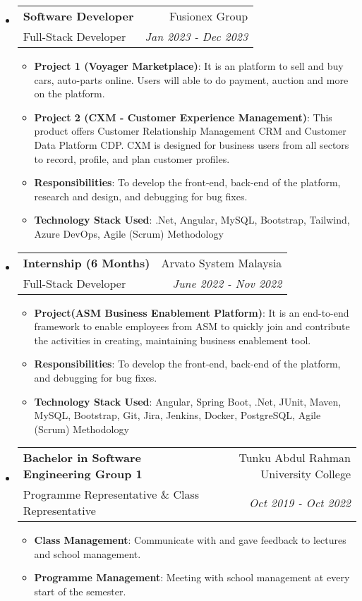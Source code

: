 \documentclass[a4paper, 12pt]{article}
\makeatletter
\newcommand{\resumeItem}[2]{
  \item\small{
    \textbf{\textsf{#1}}{: \textsf{#2} \vspace{-2pt}}
  }
}
\newcommand{\resumeSubheading}[4]{
  \vspace{-1pt}\item
    \begin{tabular*}{0.97\textwidth}[t]{l@{\extracolsep{\fill}}r}
      \textbf{\textsf{#1}} & \textsf{#2} \\
      \textsf{\small{#3}} & \textit{\textsf{\small{#4}}} \\
    \end{tabular*}\vspace{-5pt}
}
\newcommand{\resumeSubHeadingListStart}{\begin{itemize}[leftmargin=*]}
\newcommand{\resumeSubHeadingListEnd}{\end{itemize}}
\newcommand{\resumeItemListStart}{\begin{itemize}}
\newcommand{\resumeItemListEnd}{\end{itemize}\vspace{-5pt}}
\makeatother
\begin{document}
\resumeSubHeadingListStart
    \resumeSubheading
        {Software Developer}{Fusionex Group}
        {Full-Stack Developer}{Jan 2023 - Dec 2023}
            \resumeItemListStart
                \resumeItem{Project 1 (Voyager Marketplace)} 
                {It is an platform to sell and buy cars, auto-parts online. Users will able to do payment, auction and more on the platform.}
                \resumeItem{Project 2 (CXM - Customer Experience Management)} 
                {This product offers Customer Relationship Management CRM and Customer Data Platform CDP. CXM is designed for business users from all sectors to record, profile, and plan customer profiles.}
                \resumeItem{Responsibilities}
                {To develop the front-end, back-end of the platform, research and design, and debugging for bug fixes.}
                \resumeItem{Technology Stack Used}
                {.Net, Angular, MySQL, Bootstrap, Tailwind, Azure DevOps, Agile (Scrum) Methodology}
            \resumeItemListEnd
    \resumeSubheading
        {Internship (6 Months)}{Arvato System Malaysia}
        {Full-Stack Developer}{June 2022 - Nov 2022}
            \resumeItemListStart
                \resumeItem{Project(ASM Business Enablement Platform)} 
                {It is an end-to-end framework to enable employees from ASM to quickly join and contribute the activities in creating, maintaining business enablement tool.}
                \resumeItem{Responsibilities}
                {To develop the front-end, back-end of the platform, and debugging for bug fixes.}
                \resumeItem{Technology Stack Used}
                {Angular, Spring Boot, .Net, JUnit, Maven, MySQL, Bootstrap, Git, Jira, Jenkins, Docker, PostgreSQL, Agile (Scrum) Methodology}
            \resumeItemListEnd
    \resumeSubheading
        {Bachelor in Software Engineering Group 1}{Tunku Abdul Rahman University College}
        {Programme Representative \& Class Representative}{Oct 2019 - Oct 2022}
            \resumeItemListStart
                \resumeItem{Class Management}
                {Communicate with and gave feedback to lectures and school management.}
                \resumeItem{Programme Management}
                {Meeting with school management at every start of the semester.}
            \resumeItemListEnd
                    
            \vspace{5px}
\resumeSubHeadingListEnd



\vspace{0pt}
\end{document}
